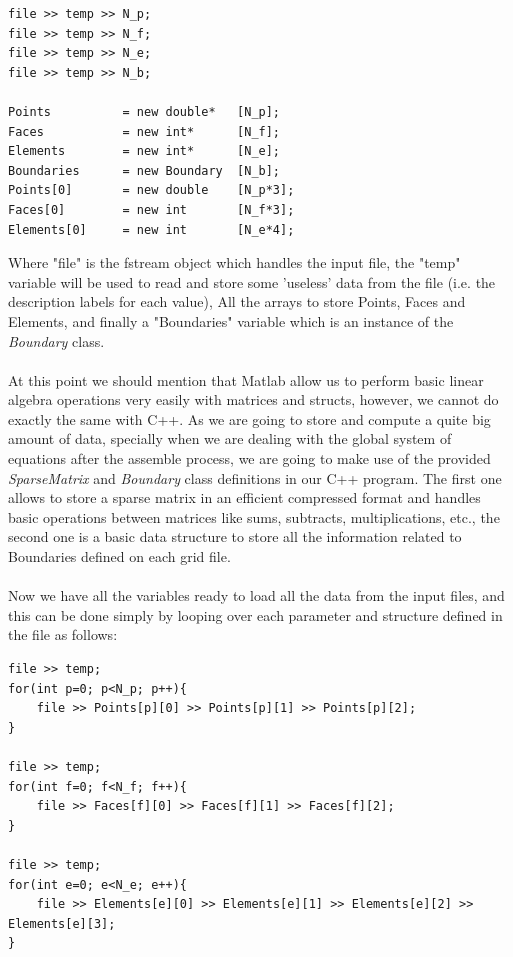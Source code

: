 \documentclass[12pt]{article}
\begin{document}
\begin{lstlisting}[style=MyC++Style]
file >> temp >> N_p;
file >> temp >> N_f;
file >> temp >> N_e;
file >> temp >> N_b;

Points			= new double*	[N_p];
Faces			= new int*		[N_f];
Elements		= new int*		[N_e];
Boundaries		= new Boundary  [N_b];
Points[0]       = new double    [N_p*3];
Faces[0]        = new int       [N_f*3];
Elements[0]     = new int       [N_e*4];
\end{lstlisting}

Where "file" is the fstream object which handles the input file, the "temp" variable will be used to read and store some 'useless' data from the file (i.e. the description labels for each value), All the arrays to store Points, Faces and Elements, and finally a "Boundaries" variable which is an instance of the \textit{Boundary} class. 
\\\\
At this point we should mention that Matlab allow us to perform basic linear algebra operations very easily with matrices and structs, however, we cannot do exactly the same with C++. As we are going to store and compute a quite big amount of data, specially when we are dealing with the global system of equations after the assemble process, we are going to make use of the provided \textit{SparseMatrix} and \textit{Boundary} class definitions in our C++ program. The first one allows to store a sparse matrix in an efficient compressed format and handles basic operations between matrices like sums, subtracts, multiplications, etc., the second one is a basic data structure to store all the information related to Boundaries defined on each grid file. 
\\\\
Now we have all the variables ready to load all the data from the input files, and this can be done simply by looping over each parameter and structure defined in the file as follows:

\begin{lstlisting}[style=MyC++Style]
file >> temp;
for(int p=0; p<N_p; p++){
	file >> Points[p][0] >> Points[p][1] >> Points[p][2];
}

file >> temp;
for(int f=0; f<N_f; f++){
	file >> Faces[f][0] >> Faces[f][1] >> Faces[f][2];
}

file >> temp;
for(int e=0; e<N_e; e++){
	file >> Elements[e][0] >> Elements[e][1] >> Elements[e][2] >> Elements[e][3];
}
\end{lstlisting}
\end{document}
